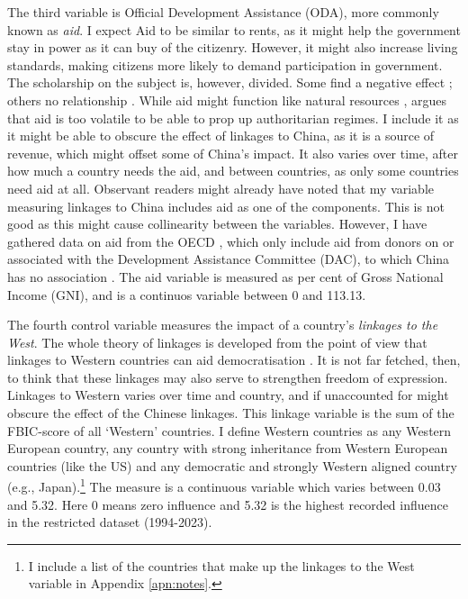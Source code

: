The third variable is Official Development Assistance (ODA), more commonly known as \textit{aid}. I expect Aid to be similar to rents, as it might help the government stay in power as it can buy of the citizenry. However, it might also increase living standards, making citizens more likely to demand participation in government. The scholarship on the subject is, however, divided. Some find a negative effect \citep{djankov_curse_2008}; others no relationship \citep{altincekic_why_2014}. While aid might function like natural resources \citep{djankov_curse_2008}, \citet[p. 30]{altincekic_why_2014} argues that aid is too volatile to be able to prop up authoritarian regimes. I include it as it might be able to obscure the effect of linkages to China, as it is a source of revenue, which might offset some of China's impact. It also varies over time, after how much a country needs the aid, and between countries, as only some countries need aid at all. Observant readers might already have noted that my variable measuring linkages to China includes aid as one of the components. This is not good as this might cause collinearity between the variables. However, I have gathered data on aid from the OECD \citep{oecd_dac2a_2025}, which only include aid from donors on or associated with the Development Assistance Committee (DAC), to which China has no association \citep{oecd_development_2025}. The aid variable is measured as per cent of Gross National Income (GNI), and is a continuos variable between 0 and 113.13. 

The fourth control variable measures the impact of a country's \textit{linkages to the West}. The whole theory of linkages is developed from the point of view that linkages to Western countries can aid democratisation \citep{levitsky_linkage_2006}. It is not far fetched, then, to think that these linkages may also serve to strengthen freedom of expression. Linkages to Western varies over time and country, and if unaccounted for might obscure the effect of the Chinese linkages. This linkage variable is the sum of the FBIC-score of all `Western' countries. I define Western countries as any Western European country, any country with strong inheritance from Western European countries (like the US) and any democratic and strongly Western aligned country (e.g., Japan).\footnote{I include a list of the countries that make up the linkages to the West variable in Appendix \ref{apn:notes}.} The measure is a continuous variable which varies between 0.03 and 5.32. Here 0 means zero influence and 5.32 is the highest recorded influence in the restricted dataset (1994-2023). 


